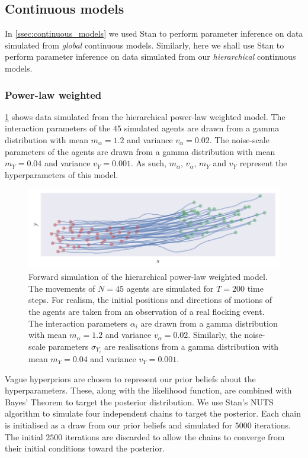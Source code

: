 \subsection{Continuous models}

In \cref{ssec:continuous_models} we used Stan to perform parameter inference on data
simulated from \emph{global} continuous models. Similarly, here we shall use Stan to
perform parameter inference on data simulated from our \emph{hierarchical} continuous
models.

\subsubsection{Power-law weighted}

\cref{fig:power_hier_sim} shows data simulated from the hierarchical power-law
weighted model. The interaction parameters of the $45$ simulated agents are drawn from a
gamma distribution with mean $m_{\alpha}=1.2$ and variance $v_{\alpha}=0.02$. The
noise-scale parameters of the agents are drawn from a gamma distribution with mean
$m_Y=0.04$ and variance $v_Y=0.001$. As such, $m_{\alpha}$, $v_{\alpha}$, $m_Y$ and $v_Y$
represent the hyperparameters of this model.

\begin{figure}[tbp]
  \includegraphics{power_hier_sim.pdf}
  \caption{Forward simulation of the hierarchical power-law weighted model. The movements
    of $N=45$ agents are simulated for $T=200$ time steps. For realism, the initial
    positions and directions of motions of the agents are taken from an observation
    of a real flocking event. The interaction parameters $\alpha_i$ are drawn from a
    gamma distribution with mean $m_{\alpha}=1.2$ and variance $v_{\alpha}=0.02$. Similarly,
    the noise-scale parameters $\sigma_{Y_i}$ are realisations from a gamma distribution
    with mean $m_Y=0.04$ and variance $v_Y=0.001$.}
  \label{fig:power_hier_sim}
\end{figure}

Vague hyperpriors are chosen to represent our prior beliefs about the hyperparameters.
These, along with the likelihood function, are combined with Bayes' Theorem to target the
posterior distribution.  We use Stan's NUTS algorithm to simulate four independent chains
to target the posterior.  Each chain is initialised as a draw from our prior beliefs and
simulated for $5000$ iterations. The initial $2500$ iterations are discarded to allow the
chains to converge from their initial conditions toward the posterior.

